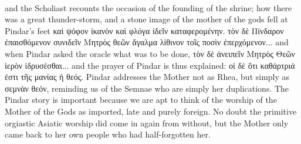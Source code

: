 \documentclass[a4paper, 11pt, oneside, polutonikogreek, english]{article}
\begin{document}
\paragraph{}
and the Scholiast recounts the occasion of the founding of the shrine; how there was a great thunder-storm, and a stone image of the mother of the gods fell at Pindar's feet καὶ ψόφον ἱκανὸν καὶ φλόγα ἰδεῖν καταφερομένην. τὸν δὲ Πίνδαρον ἐπαισθόμενον συνιδεῖν Μητρὸς θεῶν ἄγαλμα λίθινον τοῖς ποσὶν ἐπερχόμενον... and when Pindar asked the oracle what was to be done, τὸν δὲ ἀνειπεῖν Μητρὸς Θεῶν ἱερὸν ἱδρυσέσθαι... and the prayer of Pindar is thus explained: οἱ δὲ ὅτι καθάρτριά ἐστι τῆς μανίας ἡ θεός. Pindar addresses the Mother not as Rhea, but simply as σεμνὰν θεόν, reminding us of the Semnae who are simply her duplications. The Pindar story is important because we are apt to think of the worship of the Mother of the Gods as imported, late and purely foreign. No doubt the primitive orgiastic Asiatic worship did come in again from without, but the Mother only came back to her own people who had half-forgotten her.
\end{document}
